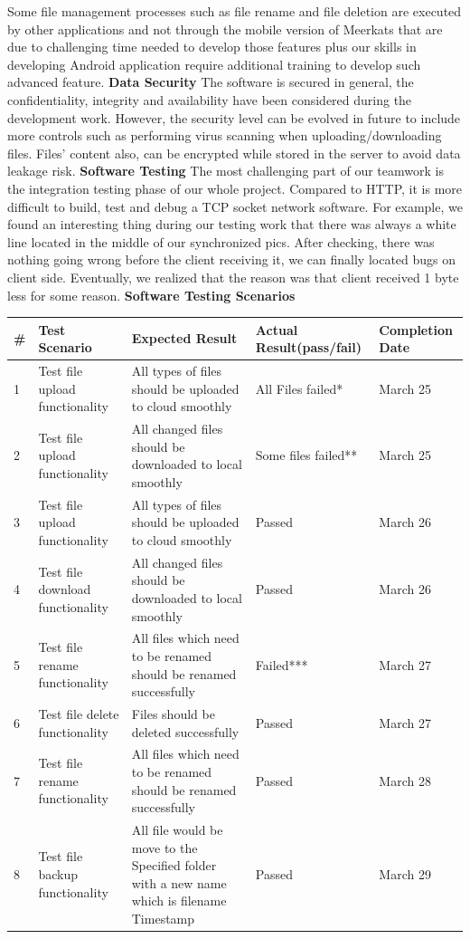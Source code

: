 \documentclass{article}
\begin{document}
Some file management processes such as file rename and file deletion are executed by other applications and not through the mobile version of Meerkats that are due to challenging time needed to develop those features plus our skills in developing Android application require additional training to develop such advanced feature.
\newline
\hfill \break
\textbf{Data Security}
The software is secured in general, the confidentiality, integrity and availability have been considered during the development work. However, the security level can be evolved in future to include more controls such as performing virus scanning when uploading/downloading files. Files’ content also, can be encrypted while stored in the server to avoid data leakage risk.
\newline
\hfill \break
\textbf{Software Testing}
The most challenging part of our teamwork is the integration testing phase of our whole project. Compared to HTTP, it is more difficult to build, test and debug a TCP socket network software. For example, we found an interesting thing during our testing work that there was always a white line located in the middle of our synchronized pics. After checking, there was nothing going wrong before the client receiving it, we can finally located bugs on client side. Eventually, we realized that the reason was that client received 1 byte less for some reason.
\newpage
\textbf{Software Testing Scenarios}
\begin{center}
\begin{tabular}{ | m{1cm}| m{2cm} | m{3cm} | m{3cm} | m{2cm} | }
\hline
\textbf{\#} & \textbf{Test Scenario} & \textbf{Expected Result} & \textbf{Actual Result(pass/fail)} & \textbf{Completion Date} \\
\hline
1 & Test file upload functionality & All types of files should be uploaded to cloud smoothly & All Files failed* & March 25  \\
\hline
2 & Test file upload functionality & All changed files should be downloaded to local smoothly & Some files failed** & March 25    \\
\hline
3 & Test file upload functionality & All types of files should be uploaded to cloud smoothly & Passed & March 26  \\
\hline
4 & Test file download functionality & All changed files should be downloaded to local smoothly & Passed &  March 26   \\
\hline
5 & Test file rename functionality & All files which need to be renamed should be renamed successfully & Failed*** & March 27 \\
\hline
6 & Test file delete functionality & Files should be deleted successfully & Passed &  March 27  \\
\hline
7 & Test file rename functionality & All files which need to be renamed should be renamed successfully & Passed &  March 28  \\
\hline
8 & Test file backup functionality & All file would be move to the Specified folder with a new name which is filename Timestamp & Passed &  March 29  \\
\hline
\end{tabular}
\end{center}
\end{document}
